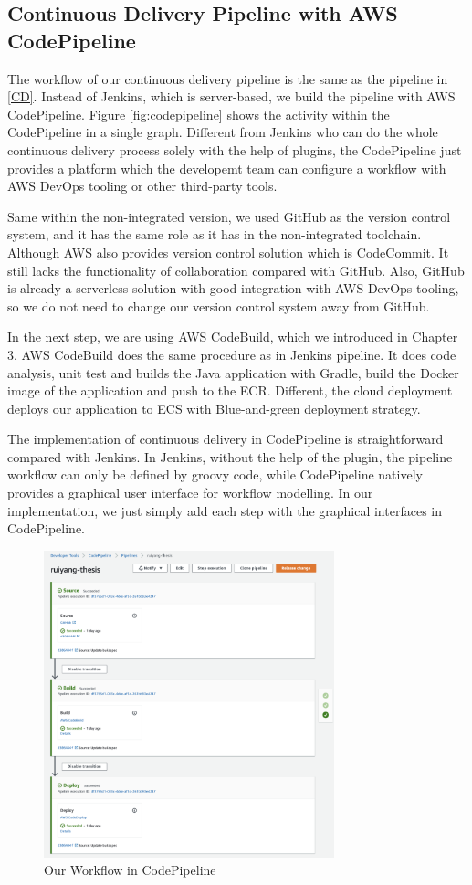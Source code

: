 \subsection{Continuous Delivery Pipeline with AWS CodePipeline}
The workflow of our continuous delivery pipeline is the same as the pipeline in \ref{CD}. Instead of Jenkins, which is server-based, we build the pipeline with AWS CodePipeline. Figure \ref{fig:codepipeline} shows the activity within the CodePipeline in a single graph. Different from Jenkins who can do the whole continuous delivery process solely with the help of plugins, the CodePipeline just provides a platform which the developemt team can configure a workflow with AWS DevOps tooling or other third-party tools. 
\par
Same within the non-integrated version, we used GitHub as the version control system, and it has the same role as it has in the non-integrated toolchain. Although AWS also provides version control solution which is CodeCommit. It still lacks the functionality of collaboration compared with GitHub. Also, GitHub is already a serverless solution with good integration with AWS DevOps tooling, so we do not need to change our version control system away from GitHub. 
\par
In the next step, we are using AWS CodeBuild, which we introduced in Chapter 3. AWS CodeBuild does the same procedure as in Jenkins pipeline. It does code analysis, unit test and builds the Java application with Gradle, build the Docker image of the application and push to the ECR. Different, the cloud deployment deploys our application to ECS with Blue-and-green deployment strategy.
\par
The implementation of continuous delivery in CodePipeline is straightforward compared with Jenkins. In Jenkins, without the help of the plugin, the pipeline workflow can only be defined by groovy code, while CodePipeline natively provides a graphical user interface for workflow modelling. In our implementation, we just simply add each step with the graphical interfaces in CodePipeline.
\begin{figure}[h]
 \centering
 \includegraphics[width=0.75\textwidth]{pics/cp-interface.png}
 \caption{Our Workflow in CodePipeline}
 \label{fig:cp-edit}
\end{figure}
